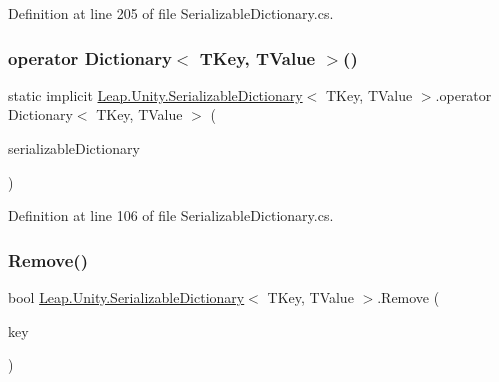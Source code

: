 Definition at line 205 of file Serializable\+Dictionary.\+cs.

\mbox{\label{class_leap_1_1_unity_1_1_serializable_dictionary_aee53ce7d72c6a43a1c90e43c8a321272}} 
\subsubsection{\texorpdfstring{operator Dictionary$<$ TKey, TValue $>$()}{operator Dictionary< TKey, TValue >()}}
{\footnotesize\ttfamily static implicit \mbox{\hyperlink{class_leap_1_1_unity_1_1_serializable_dictionary}{Leap.\+Unity.\+Serializable\+Dictionary}}$<$ T\+Key, T\+Value $>$.operator Dictionary$<$ T\+Key, T\+Value $>$ (\begin{DoxyParamCaption}\item[{\mbox{\hyperlink{class_leap_1_1_unity_1_1_serializable_dictionary}{Serializable\+Dictionary}}$<$ T\+Key, T\+Value $>$}]{serializable\+Dictionary }\end{DoxyParamCaption})\hspace{0.3cm}{\ttfamily [static]}}



Definition at line 106 of file Serializable\+Dictionary.\+cs.

\mbox{\label{class_leap_1_1_unity_1_1_serializable_dictionary_a30c184229841877e480fd3cb1a16d207}} 
\subsubsection{\texorpdfstring{Remove()}{Remove()}}
{\footnotesize\ttfamily bool \mbox{\hyperlink{class_leap_1_1_unity_1_1_serializable_dictionary}{Leap.\+Unity.\+Serializable\+Dictionary}}$<$ T\+Key, T\+Value $>$.Remove (\begin{DoxyParamCaption}\item[{T\+Key}]{key }\end{DoxyParamCaption})}



